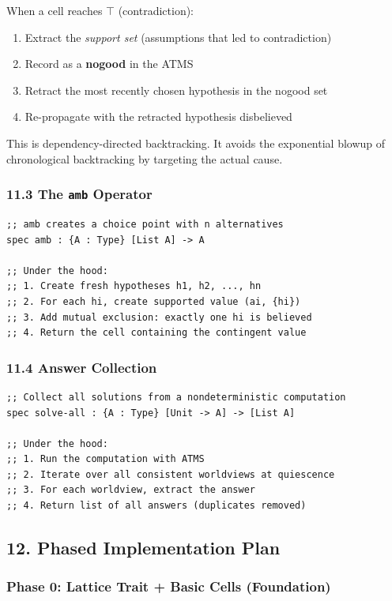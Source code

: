 \documentclass[11pt]{article}
\begin{document}
When a cell reaches \(\top\) (contradiction):

\begin{enumerate}
\item Extract the \emph{support set} (assumptions that led to contradiction)
\item Record as a \textbf{nogood} in the ATMS
\item Retract the most recently chosen hypothesis in the nogood set
\item Re-propagate with the retracted hypothesis disbelieved
\end{enumerate}

This is dependency-directed backtracking. It avoids the exponential
blowup of chronological backtracking by targeting the actual cause.
\subsubsection{11.3 The \texttt{amb} Operator}
\label{sec:org0251a8e}

\begin{verbatim}
;; amb creates a choice point with n alternatives
spec amb : {A : Type} [List A] -> A

;; Under the hood:
;; 1. Create fresh hypotheses h1, h2, ..., hn
;; 2. For each hi, create supported value (ai, {hi})
;; 3. Add mutual exclusion: exactly one hi is believed
;; 4. Return the cell containing the contingent value
\end{verbatim}
\subsubsection{11.4 Answer Collection}
\label{sec:org9206a95}

\begin{verbatim}
;; Collect all solutions from a nondeterministic computation
spec solve-all : {A : Type} [Unit -> A] -> [List A]

;; Under the hood:
;; 1. Run the computation with ATMS
;; 2. Iterate over all consistent worldviews at quiescence
;; 3. For each worldview, extract the answer
;; 4. Return list of all answers (duplicates removed)
\end{verbatim}
\subsection{12. Phased Implementation Plan}
\label{sec:org42751be}

\subsubsection{Phase 0: Lattice Trait + Basic Cells (Foundation)}
\label{sec:org485a968}
\end{document}
